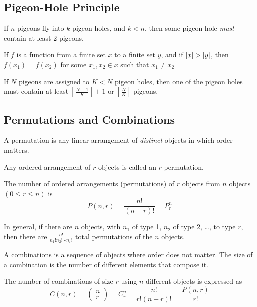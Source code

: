     \subsection{Pigeon-Hole Principle}
    \begin{thm}
        If $n$ pigeons fly into $k$ pigeon holes, and $k < n$, then some pigeon hole \textit{must} contain at least 2 pigeons.

        If $f$ is a function from a finite set $x$ to a finite set $y$, and if $\left\lvert x \right\rvert > \left\lvert y \right\rvert$, then $f(x_1) = f(x_2)$ for some $x_1, x_2 \in x$ such that $x_1 \neq x_2$
    \end{thm}

    \begin{thm}
        If $N$ pigeons are assigned to $K < N$ pigeon holes, then one of the pigeon holes must contain at least $\left \lfloor{\frac{N-1}{K}}\right \rfloor + 1$ or $\left \lceil{\frac{N}{K}}\right \rceil $ pigeons.
    \end{thm}

    \subsection{Permutations and Combinations}

    \begin{thm}[Permutations]
        A permutation is any linear arrangement of \textit{distinct} objects in which order matters.

        Any ordered arrangement of $r$ objects is called an $r$-permutation.

        The number of ordered arrangements (permutations) of $r$ objects from $n$ objects $(0 \le r \le n)$ is
            \[
                P(n, r) = \frac{n!}{(n - r)!} = P^n_r
            \]

        In general, if there are $n$ objects, with $n_1$ of type 1, $n_2$ of type 2, \ldots, to type $r$, then there are $\frac{n!}{n_1! n_2! \cdots n_r!}$ total permutations of the $n$ objects.
    \end{thm}

    \begin{thm}
        A combinations is a sequence of objects where order does not matter. The size of a combination is the number of different elements that compose it.

        The number of combinations of size $r$ using $n$ different objects is expressed as
            \[
                C(n, r) = \begin{pmatrix}n\\r\end{pmatrix} = C^n_r = \frac{n!}{r!(n - r)!} = \frac{P(n, r)}{r!}
            \]
    \end{thm}

